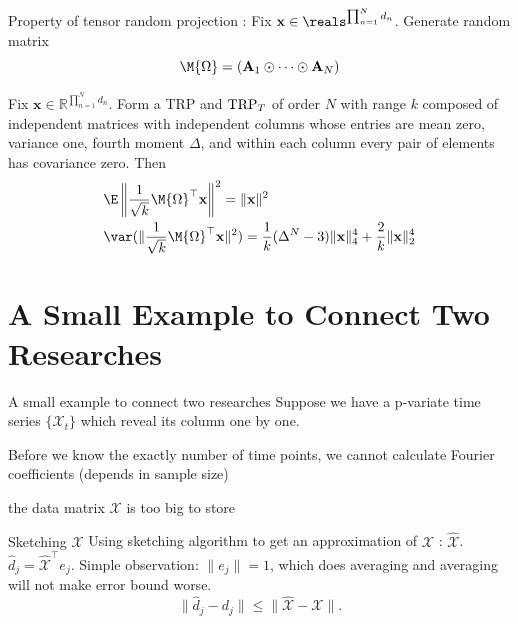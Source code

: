 \documentclass[handout,xcolor={usenames,dvipsnames}]{beamer}
\begin{document}
\begin{frame}{Property of tensor random projection}
:
Fix $\mathbf{x} \in \reals^{\prod_{n=1}^N d_n}$. Generate random matrix 
\[
\M{\Omega}= (\mathbf{A}_1 \odot \cdots \odot \mathbf{A}_N)
\]
\begin{thm}
	Fix $\mathbf{x} \in \mathbb{R}^{\prod_{n=1}^N d_n}$.
	Form a TRP and $\textup{TRP}_T$ of order $N$ with range $k$
	composed of independent matrices with independent columns
	whose entries are mean zero, variance one, fourth moment $\Delta$, and within each column every pair of elements has covariance zero.
	Then
\begin{equation}
\begin{aligned}
& \E \left\| \frac{1}{\sqrt{k}}\M{\Omega}^\top \mathbf{x} \right\|^2 = \|\mathbf{x}\|^2  \\
& \var(\|\frac{1}{\sqrt{k}}\M{\Omega}^\top \mathbf{x}\|^2) = \frac{1}{k}(\Delta^N-3)\|\mathbf{x}\|_4^4 + \frac{2}{k}\|\mathbf{x}\|_2^4 
\end{aligned}
\end{equation}
\end{thm}
\end{frame}



\section{A Small Example to Connect Two Researches}


\begin{frame}{A small example to connect two researches}
Suppose we have a p-variate time series $\{\mathcal{X}_t\}$ which reveal its column one by one. 

\bit 
\item Before we know the exactly number of time points, we cannot calculate Fourier coefficients (depends in sample size)
\item the data matrix $\mathcal{X}$ is too big to store 
\eit
\end{frame}


\begin{frame}{Sketching $\mathcal{X}$}
Using sketching algorithm  to get an approximation of $\mathcal{X}$ : $\hat{\mathcal{X}}$. 
$\hat{d}_j = \hat{\mathcal{X}}^\top e_j$.  Simple observation: $\|e_j\| = 1$, which does averaging and averaging will not make error bound worse. 
\[
\|\hat{d}_j - d_j\| \le \|\hat{\mathcal{X}} - \mathcal{X}\|. 
\]
\end{frame}







\end{document}
